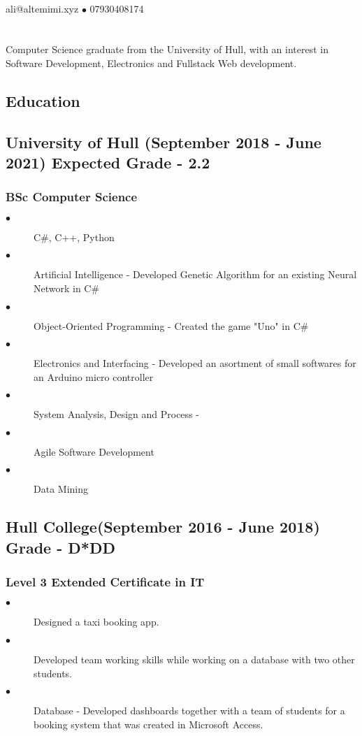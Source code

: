 \documentclass{article}
\author{Ali Al Temimi}
\makeatletter
\renewcommand{\maketitle}{
\begin{center}
    {\huge\bfseries
    \theauthor}
    {\Large \\ali@altemimi.xyz $\bullet$ 07930408174}
    \vspace{-4em}
\end{center}
}
\makeatother
\begin{document}
    \maketitle
\section{}
Computer Science graduate from the University of Hull, with an interest in Software Development, Electronics and Fullstack Web development. 
    \begin{multicols}{2}
        \section{Education}
        \subsection{University of Hull (September 2018 - June 2021) Expected Grade - 2.2}
        \subsubsection{BSc Computer Science}
        \begin{description}
            \item[$\bullet$]C\#, C++, Python
            \item[$\bullet$]Artificial Intelligence - Developed Genetic Algorithm for an existing Neural Network in C\#
            \item[$\bullet$]Object-Oriented Programming - Created the game "Uno" in C\# 
            \item[$\bullet$]Electronics and Interfacing - Developed an asortment of small softwares for an Arduino micro controller
            \item[$\bullet$]System Analysis, Design and Process - 
            \item[$\bullet$]Agile Software Development 
            \item[$\bullet$]Data Mining 
        \end{description}
        \subsection{Hull College(September 2016 - June 2018) Grade - D*DD}
        \subsubsection{Level 3 Extended Certificate in IT}
        \begin{description}
            \item[$\bullet$]Designed a taxi booking app.
            \item[$\bullet$]Developed team working skills while working on a database with two other students. 
            \item[$\bullet$]Database - Developed dashboards together with a team of students for a booking system that was created in Microsoft Access. 
        \end{description}

\end{multicols}
\end{document}

